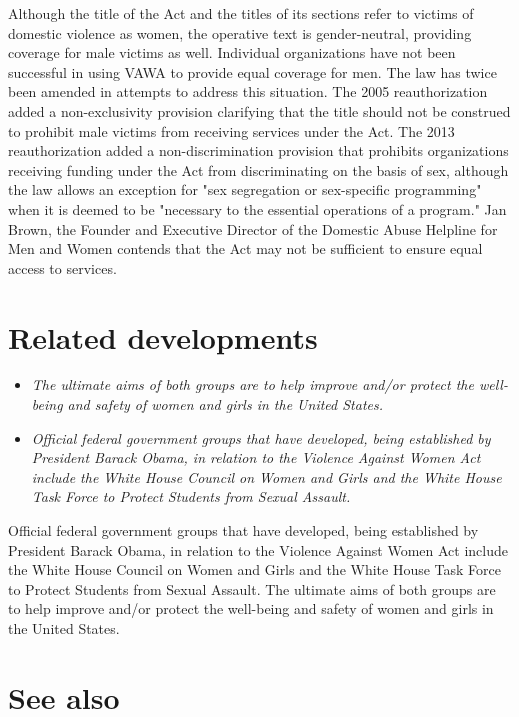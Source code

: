 Although the title of the Act and the titles of its sections refer to
victims of domestic violence as women, the operative text is
gender-neutral, providing coverage for male victims as well. Individual
organizations have not been successful in using VAWA to provide equal
coverage for men. The law has twice been amended in attempts to address
this situation. The 2005 reauthorization added a non-exclusivity
provision clarifying that the title should not be construed to prohibit
male victims from receiving services under the Act. The 2013
reauthorization added a non-discrimination provision that prohibits
organizations receiving funding under the Act from discriminating on the
basis of sex, although the law allows an exception for "sex segregation
or sex-specific programming" when it is deemed to be "necessary to the
essential operations of a program." Jan Brown, the Founder and Executive
Director of the Domestic Abuse Helpline for Men and Women contends that
the Act may not be sufficient to ensure equal access to services.

\section{Related developments}\label{related-developments}

\begin{itemize}
\item
  \emph{The ultimate aims of both groups are to help improve and/or
  protect the well-being and safety of women and girls in the United
  States.}
\item
  \emph{Official federal government groups that have developed, being
  established by President Barack Obama, in relation to the Violence
  Against Women Act include the White House Council on Women and Girls
  and the White House Task Force to Protect Students from Sexual
  Assault.}
\end{itemize}

Official federal government groups that have developed, being
established by President Barack Obama, in relation to the Violence
Against Women Act include the White House Council on Women and Girls and
the White House Task Force to Protect Students from Sexual Assault. The
ultimate aims of both groups are to help improve and/or protect the
well-being and safety of women and girls in the United States.

\section{See also}\label{see-also}

